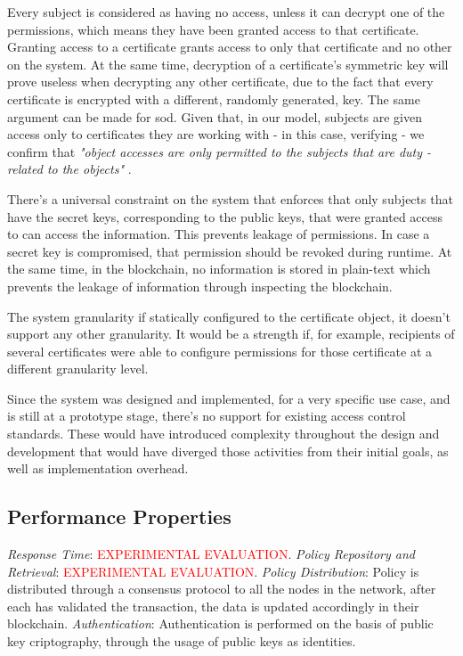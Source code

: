 Every subject is considered as having no access, unless it can decrypt one of the permissions, which means they have been granted access to that certificate. Granting access to a certificate grants access to only that certificate and no other on the system. At the same time, decryption of a certificate's symmetric key will prove useless when decrypting any other certificate, due to the fact that every certificate is encrypted with a different, randomly generated, key. The same argument can be made for \gls{sod}. Given that, in our model, subjects are given access only to certificates they are working with - in this case, verifying - we confirm that \emph{"object accesses are only permitted to the subjects that are duty
-related to the objects"} \cite[17]{hu_guidelines_2012}.

There's a universal constraint on the system that enforces that only subjects that have the secret keys, corresponding to the public keys, that were granted access to can access the information. This prevents leakage of permissions. In case a secret key is compromised, that permission should be revoked during runtime. At the same time, in the blockchain, no information is stored in plain-text which prevents the leakage of information through inspecting the blockchain. 

The system granularity if statically configured to the certificate object, it doesn't support any other granularity. It would be a strength if, for example, recipients of several certificates were able to configure permissions for those certificate at a different granularity level.

Since the system was designed and implemented, for a very specific use case, and is still at a prototype stage, there's no support for existing access control standards. These would have introduced complexity throughout the design and development that would have diverged those activities from their initial goals, as well as implementation overhead.

\subsection{Performance Properties}

\emph{Response Time}: \textcolor{red}{EXPERIMENTAL EVALUATION}. \emph{Policy Repository and Retrieval}: \textcolor{red}{EXPERIMENTAL EVALUATION}. \emph{Policy Distribution}: Policy is distributed through a consensus protocol to all the nodes in the network, after each has validated the transaction, the data is updated accordingly in their blockchain. \emph{Authentication}: Authentication is performed on the basis of public key criptography, through the usage of public keys as identities.

